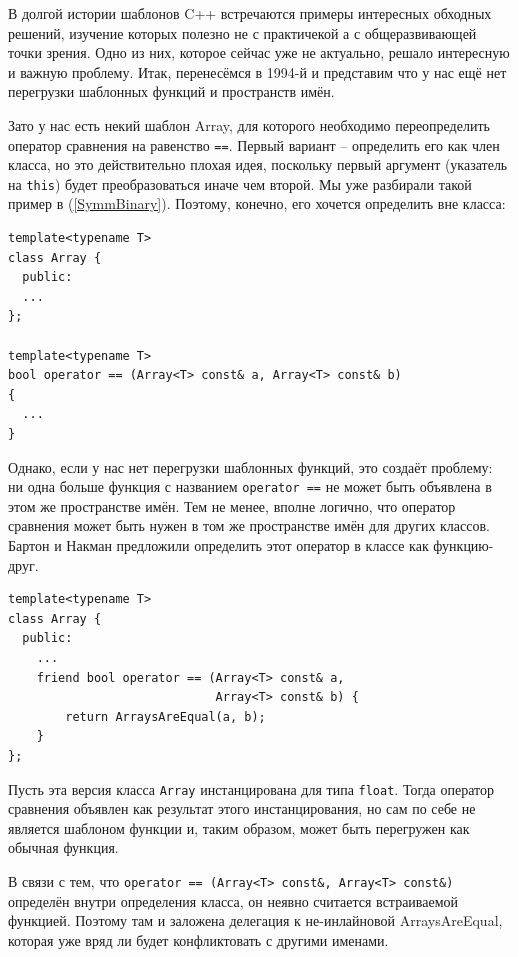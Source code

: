 \documentclass[a4paper,12pt,oneside]{article}
\begin{document}
В долгой истории шаблонов C++ встречаются примеры интересных обходных решений, изучение которых полезно не с практичекой а с общеразвивающей точки зрения. Одно из них, которое сейчас уже не актуально, решало интересную и важную проблему. Итак, перенесёмся в 1994-й и представим что у нас ещё нет перегрузки шаблонных функций и пространств имён.

Зато у нас есть некий шаблон Array, для которого необходимо переопределить оператор сравнения на равенство \lstinline!==!. Первый вариант -- определить его как член класса, но это действительно плохая идея, поскольку первый аргумент (указатель на \lstinline!this!) будет преобразоваться иначе чем второй. Мы уже разбирали такой пример в (\ref{SymmBinary}). Поэтому, конечно, его хочется определить вне класса:

\begin{lstlisting}
template<typename T> 
class Array { 
  public: 
  ...
}; 

template<typename T> 
bool operator == (Array<T> const& a, Array<T> const& b) 
{ 
  ... 
} 
\end{lstlisting}

Однако, если у нас нет перегрузки шаблонных функций, это создаёт проблему: ни одна больше функция с названием \lstinline!operator ==! не может быть объявлена в этом же пространстве имён. Тем не менее, вполне логично, что оператор сравнения может быть нужен в том же пространстве имён для других классов. Бартон и Накман предложили определить этот оператор в классе как функцию-друг.

\begin{lstlisting}
template<typename T> 
class Array { 
  public: 
    ... 
    friend bool operator == (Array<T> const& a, 
                             Array<T> const& b) { 
        return ArraysAreEqual(a, b); 
    } 
}; 
\end{lstlisting}

Пусть эта версия класса \lstinline!Array! инстанцирована для типа \lstinline!float!. Тогда оператор сравнения объявлен как результат этого инстанцирования, но сам по себе не является шаблоном функции и, таким образом, может быть перегружен как обычная функция.

В связи с тем, что \lstinline!operator == (Array<T> const&, Array<T> const&)! определён внутри определения класса, он неявно считается встраиваемой функцией. Поэтому там и заложена делегация к не-инлайновой ArraysAreEqual, которая уже вряд ли будет конфликтовать с другими именами.

\pagebreak
\end{document}
